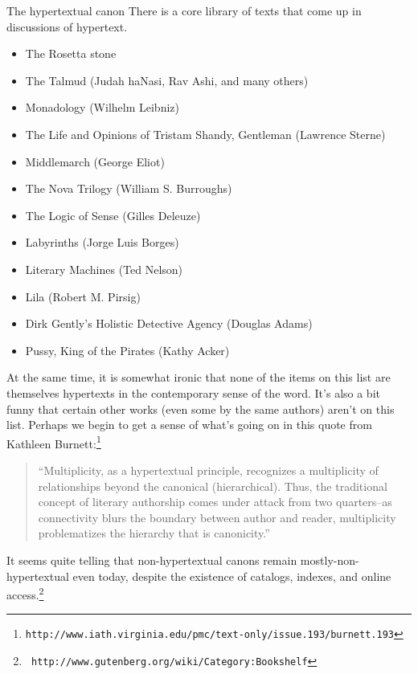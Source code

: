 \begin{notate}{The hypertextual canon} \label{canon}
There is a core library of texts that come up in
discussions of hypertext.
\begin{itemize}
\item The Rosetta stone
\item The Talmud (Judah haNasi, Rav Ashi, and many others)
\item Monadology (Wilhelm Leibniz)
\item The Life and Opinions of Tristam Shandy, Gentleman
  (Lawrence Sterne)
\item Middlemarch (George Eliot)
\item The Nova Trilogy (William S. Burroughs)
\item The Logic of Sense (Gilles Deleuze)
\item Labyrinths (Jorge Luis Borges)
\item Literary Machines (Ted Nelson)
\item Lila (Robert M. Pirsig)
\item Dirk Gently's Holistic Detective Agency
  (Douglas Adams)
\item Pussy, King of the Pirates (Kathy Acker)
\end{itemize}
At the same time, it is somewhat ironic that none of the
items on this list are themselves hypertexts in the
contemporary sense of the word.  It's also a bit funny
that certain other works (even some by the same authors)
aren't on this list.  Perhaps we begin to get a sense of
what's going on in this quote from Kathleen
Burnett:\footnote{{\tt http://www.iath.virginia.edu/pmc/text-only/issue.193/burnett.193}}
\begin{quote}
``Multiplicity, as a hypertextual principle, recognizes a
  multiplicity of relationships beyond the canonical
  (hierarchical).  Thus, the traditional concept of
  literary authorship comes under attack from two
  quarters--as connectivity blurs the boundary between
  author and reader, multiplicity problematizes the
  hierarchy that is canonicity.''
\end{quote}
It seems quite telling that non-hypertextual canons remain
mostly-non-hypertextual even today, despite the existence
of catalogs, indexes, and online access.\footnote{{\tt
    http://www.gutenberg.org/wiki/Category:Bookshelf}}
\end{notate}

